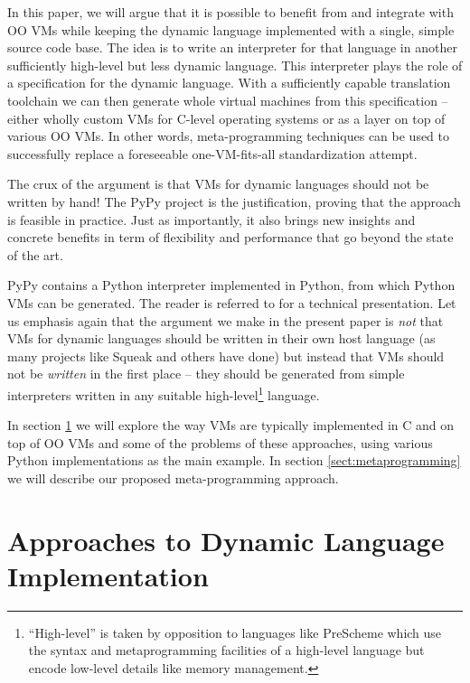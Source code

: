 \documentclass{llncs}
\begin{document}
In this paper, we will argue that it is possible to
benefit from and integrate with OO VMs while keeping the dynamic
language implemented with a single, simple source code base.  The idea is
to write an interpreter for that language in another sufficiently
high-level but less dynamic language.  This interpreter plays the role
of a specification for the dynamic language.  With a sufficiently capable
translation toolchain we can then generate whole virtual machines from
this specification -- either wholly custom VMs for C-level operating
systems or as a layer on top of various OO VMs.  In other words,
meta-programming techniques can be used to successfully replace a
foreseeable one-VM-fits-all standardization attempt.

The crux of the argument is that VMs for dynamic languages should not be
written by hand!  The PyPy project \cite{pypy} is the justification,
proving that the approach is
feasible in practice.  Just as importantly, it also brings new insights
and concrete benefits in term of flexibility and performance that go
beyond the state of the art.

PyPy contains a Python interpreter implemented in Python, from which
Python VMs can be generated.  The reader is referred to
\cite{pypyvmconstruction} for a technical presentation.  Let us emphasis
again that the argument we make in the present paper is \emph{not} that
VMs for dynamic languages should be written in their own host language
(as many projects like Squeak \cite{Squeak} and others have done) but
instead that VMs should not be \emph{written} in the first place -- they
should be generated from simple interpreters written in any suitable
high-level\footnote{``High-level'' is taken by opposition to languages
like PreScheme \cite{kelsey-prescheme} which use the syntax and
metaprogramming facilities of a high-level language but encode
low-level details like memory management.} language.

In section \ref{sect:approaches} we will explore the way VMs are typically
implemented in C and on top of OO VMs and some of the problems of these
approaches, using various Python implementations as the main example. In
section \ref{sect:metaprogramming} we will describe our proposed
meta-programming approach.


\section{Approaches to Dynamic Language Implementation}
\label{sect:approaches}
\end{document}
